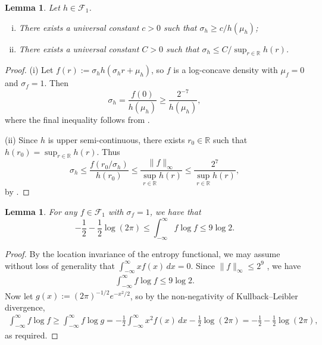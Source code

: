 \documentclass[a4paper,12pt]{article}
\newtheorem{lemma}[theorem]{Lemma}
\begin{document}
  \begin{lemma}
    \label{Lem:VarianceSupRelation}
    Let $h \in \mathcal{F}_1$.  
    \begin{enumerate}[(i)]
    \item There exists a universal constant $c > 0$ such that $\sigma_h \geq c/h(\mu_h)$;
    \item There exists a universal constant $C > 0$ such that $\sigma_h \leq C/\sup_{r \in \mathbb{R}} h(r)$.
    \end{enumerate}
  \end{lemma}

  \begin{proof}
(i)  Let $f(r) := \sigma_h h(\sigma_h r + \mu_h)$, so $f$ is a log-concave density with $\mu_f = 0$ and $\sigma_f=1$. Then
    \[
 \sigma_h = \frac{f(0)}{h(\mu_h)} \geq \frac{2^{-7}}{h(\mu_h)},
    \]
where the final inequality follows from \citet[][Theorem~5.14(d)]{lovasz2007geometry}.

(ii) Since $h$ is upper semi-continuous, there exists $r_0 \in \mathbb{R}$ such that $h(r_0) = \sup_{r \in \mathbb{R}} h(r)$.  Thus
    \[
\sigma_h \leq \frac{f(r_0/\sigma_h)}{h(r_0)} \leq \frac{\|f\|_\infty}{\sup_{r \in \mathbb{R}} h(r)} \leq \frac{2^7}{\sup_{r \in \mathbb{R}} h(r)},
    \]
by \citet[][Theorem~5.14(b) and (d)]{lovasz2007geometry}.
  \end{proof}

\begin{lemma}
  \label{Lem:DifferentialEntropyBound}
  For any $f \in \mathcal{F}_1$ with $\sigma_f = 1$, we have that
  \[
    -\frac{1}{2} - \frac{1}{2}\log (2\pi) \leq    \int_{-\infty}^\infty f \log f \leq 9 \log 2.
  \]
\end{lemma}
\begin{proof}
By the location invariance of the entropy functional, we may assume without loss of generality that $\int_{-\infty}^\infty xf(x) \, dx = 0$.  Since $\|f\|_\infty \leq 2^9$ \citep[][Theorem~5.14(b) and (d)]{lovasz2007geometry}, we have
  \begin{align*}
    \int_{-\infty}^\infty f\log f \leq 9 \log 2.
  \end{align*}
Now let $g(x) := (2\pi)^{-1/2}e^{-x^2/2}$, so by the non-negativity of Kullback--Leibler divergence, 
  \begin{align*}
    \int_{-\infty}^\infty f \log f \geq \int_{-\infty}^\infty f \log g = - \frac{1}{2}\int_{-\infty}^\infty x^2 f(x) \, dx - \frac{1}{2}\log (2\pi) = -\frac{1}{2} - \frac{1}{2}\log (2\pi),
  \end{align*}
as required.
\end{proof}
\end{document}
